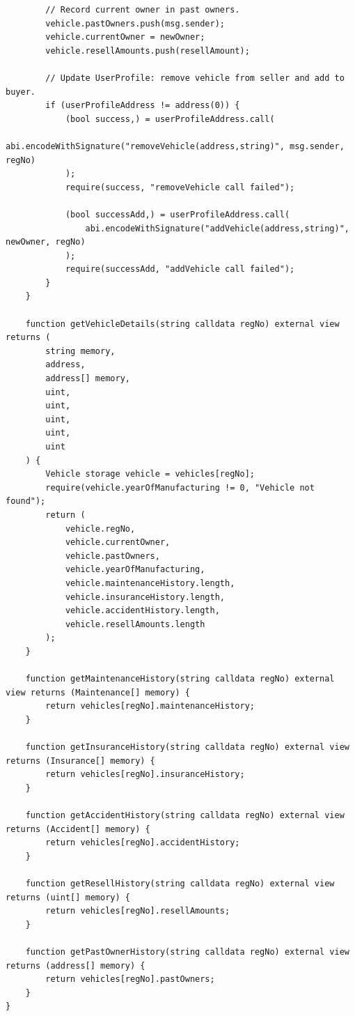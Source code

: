 \documentclass[12pt,a4paper]{article}
\begin{document}
\begin{verbatim}
        // Record current owner in past owners.
        vehicle.pastOwners.push(msg.sender);
        vehicle.currentOwner = newOwner;
        vehicle.resellAmounts.push(resellAmount);

        // Update UserProfile: remove vehicle from seller and add to buyer.
        if (userProfileAddress != address(0)) {
            (bool success,) = userProfileAddress.call(
                abi.encodeWithSignature("removeVehicle(address,string)", msg.sender, regNo)
            );
            require(success, "removeVehicle call failed");

            (bool successAdd,) = userProfileAddress.call(
                abi.encodeWithSignature("addVehicle(address,string)", newOwner, regNo)
            );
            require(successAdd, "addVehicle call failed");
        }
    }

    function getVehicleDetails(string calldata regNo) external view returns (
        string memory,
        address,
        address[] memory,
        uint,
        uint,
        uint,
        uint,
        uint
    ) {
        Vehicle storage vehicle = vehicles[regNo];
        require(vehicle.yearOfManufacturing != 0, "Vehicle not found");
        return (
            vehicle.regNo,
            vehicle.currentOwner,
            vehicle.pastOwners,
            vehicle.yearOfManufacturing,
            vehicle.maintenanceHistory.length,
            vehicle.insuranceHistory.length,
            vehicle.accidentHistory.length,
            vehicle.resellAmounts.length
        );
    }

    function getMaintenanceHistory(string calldata regNo) external view returns (Maintenance[] memory) {
        return vehicles[regNo].maintenanceHistory;
    }

    function getInsuranceHistory(string calldata regNo) external view returns (Insurance[] memory) {
        return vehicles[regNo].insuranceHistory;
    }

    function getAccidentHistory(string calldata regNo) external view returns (Accident[] memory) {
        return vehicles[regNo].accidentHistory;
    }

    function getResellHistory(string calldata regNo) external view returns (uint[] memory) {
        return vehicles[regNo].resellAmounts;
    }

    function getPastOwnerHistory(string calldata regNo) external view returns (address[] memory) {
        return vehicles[regNo].pastOwners;
    }
}
    \end{verbatim}
\end{document}
